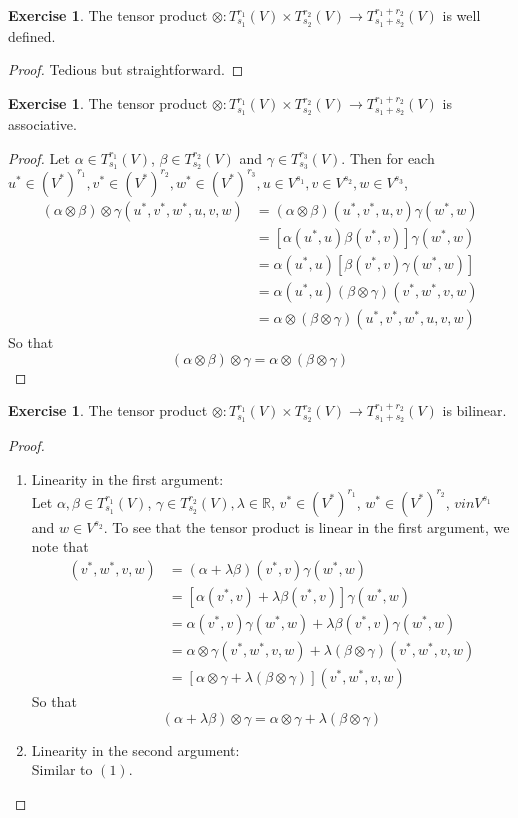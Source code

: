 \documentclass[12pt]{amsart}
\theoremstyle{definition}
\theoremstyle{definition}
\newtheorem{ex}[definition]{Exercise}
\newcommand{\al}{\alpha}
\newcommand{\gam}{\gamma}
\newcommand{\bet}{\beta}
\newcommand{\lam}{\lambda}
\newcommand{\R}{\mathbb{R}}
\newcommand{\Tn}[1]{T^{r_{#1}}_{s_{#1}}(V)}
\newcommand{\Tnp}{T^{r_1 + r_2}_{s_1 + s_2}(V)}
\begin{document}
	\begin{ex}
	The tensor product $\otimes : \Tn{1} \times  \Tn{2} \rightarrow \Tnp$ is well defined. 
	\end{ex}
	
	\begin{proof}
	Tedious but straightforward.
\end{proof}	
	
	\begin{ex}
	The tensor product $\otimes : \Tn{1} \times  \Tn{2} \rightarrow \Tnp$ is associative. 
	\end{ex}
	
	\begin{proof}
	Let $\al \in \Tn{1}$, $\bet \in \Tn{2}$ and $\gam \in \Tn{3}$. Then for each $u^* \in (V^*)^{r_1}, v^* \in (V^*)^{r_2}, w^* \in (V^*)^{r_3}, u \in V^{s_1}, v \in V^{s_2}, w \in V^{s_3}$,  
	\begin{align*}
	(\al \otimes \bet) \otimes \gam (u^*, v^*, w^*, u, v, w) 
	&= (\al \otimes \bet) (u^*, v^*, u, v) \gam (w^*, w) \\
	&= [\al(u^*, u) \bet(v^*, v)] \gam(w^*, w) \\
	&= \al(u^*, u) [\bet(v^*, v) \gam(w^*, w)] \\
	&= \al(u^*, u) (\bet \otimes \gam) (v^*, w^*, v, w) \\
	&= \al \otimes (\bet \otimes \gam)(u^*, v^*, w^*, u, v, w) 
	\end{align*}
	So that $$(\al \otimes \bet) \otimes \gam = \al \otimes (\bet \otimes \gam)$$
\end{proof}		
	
	\begin{ex}
	The tensor product $\otimes : \Tn{1} \times  \Tn{2} \rightarrow \Tnp$ is bilinear. 
	\end{ex}
	
	\begin{proof}\
	\begin{enumerate}
	\item Linearity in the first argument:\\
	Let $\al, \bet \in \Tn{1}$, $ \gam \in \Tn{2}, \lam \in \R$, $v^* \in (V^*)^{r_1}$, $w^* \in (V^*)^{r_2}$, $v in V^{s_1}$ and $w \in V^{s_2}$. To see that the tensor product is linear in the first argument, we note that  
	\begin{align*}
	[(\al + \lam \bet) \otimes \gam] (v^*, w^*, v, w) 
	&= (\al + \lam \bet)(v^*, v) \gam(w^*, w) \\
	&= [\al(v^*, v) + \lam \bet (v^*, v)] \gam (w^*, w) \\
	&= \al(v^*, v) \gam (w^*, w) + \lam \bet (v^*, v) \gam (w^*, w) \\
	&= \al \otimes \gam (v^*, w^*, v, w)  + \lam (\bet \otimes \gam) (v^*, w^*, v, w) \\
	&= [\al \otimes \gam + \lam (\bet \otimes \gam)] (v^*, w^*, v, w) 
	\end{align*}
	So that $$(\al + \lam \bet) \otimes \gam = \al \otimes \gam + \lam (\bet \otimes \gam)$$
	\item Linearity in the second argument:\\
	Similar to $(1)$.
	\end{enumerate}
\end{proof}			
	
\end{document}
